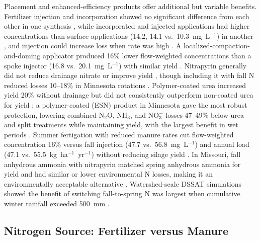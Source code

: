 \documentclass[11pt]{article}
\begin{document}
Placement and enhanced-efficiency products offer additional but variable benefits. Fertilizer injection and incorporation showed no significant difference from each other in one synthesis \parencite{Liu2021}, while incorporated and injected applications had higher concentrations than surface applications (14.2, 14.1 vs.\ 10.3~mg~L$^{-1}$) in another \parencite{Hertzberger2019}, and injection could increase loss when rate was high \parencite{Jeong2018}. A localized-compaction-and-doming applicator produced 16\% lower flow-weighted concentrations than a spoke injector (16.8 vs.\ 20.1~mg~L$^{-1}$) with similar yield \parencite{Bakhsh2010}. Nitrapyrin generally did not reduce drainage nitrate or improve yield \parencite{Vetsch2019,Pittelkow2017}, though including it with fall N reduced losses 10--18\% in Minnesota rotations \parencite{Randall2003,Randall2005}. Polymer-coated urea increased yield 20\% without drainage but did not consistently outperform non-coated urea for yield \parencite{Nash2015,Nash2015b}; a polymer-coated (ESN) product in Minnesota gave the most robust protection, lowering combined N$_2$O, NH$_3$, and NO$_3^-$ losses 47--49\% below urea and split treatments while maintaining yield, with the largest benefit in wet periods \parencite{Menegaz2025}. Summer fertigation with reduced manure rates cut flow-weighted concentration 16\% versus fall injection (47.7 vs.\ 56.8~mg~L$^{-1}$) and annual load (47.1 vs.\ 55.5~kg~ha$^{-1}$~yr$^{-1}$) without reducing silage yield \parencite{Gamble2018}. In Missouri, fall anhydrous ammonia with nitrapyrin matched spring anhydrous ammonia for yield and had similar or lower environmental N losses, making it an environmentally acceptable alternative \parencite{Kaur2024,Kaur2024c}. Watershed-scale DSSAT simulations showed the benefit of switching fall-to-spring N was largest when cumulative winter rainfall exceeded 500~mm \parencite{Banger2018}.

\subsection{Nitrogen Source: Fertilizer versus Manure}
\end{document}
